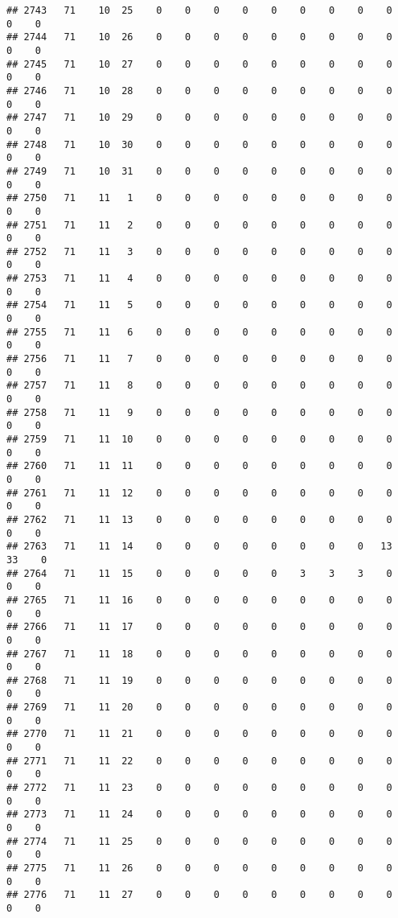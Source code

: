 \documentclass[]{article}
\begin{document}
\begin{verbatim}
## 2743   71    10  25    0    0    0    0    0    0    0    0    0    0    0
## 2744   71    10  26    0    0    0    0    0    0    0    0    0    0    0
## 2745   71    10  27    0    0    0    0    0    0    0    0    0    0    0
## 2746   71    10  28    0    0    0    0    0    0    0    0    0    0    0
## 2747   71    10  29    0    0    0    0    0    0    0    0    0    0    0
## 2748   71    10  30    0    0    0    0    0    0    0    0    0    0    0
## 2749   71    10  31    0    0    0    0    0    0    0    0    0    0    0
## 2750   71    11   1    0    0    0    0    0    0    0    0    0    0    0
## 2751   71    11   2    0    0    0    0    0    0    0    0    0    0    0
## 2752   71    11   3    0    0    0    0    0    0    0    0    0    0    0
## 2753   71    11   4    0    0    0    0    0    0    0    0    0    0    0
## 2754   71    11   5    0    0    0    0    0    0    0    0    0    0    0
## 2755   71    11   6    0    0    0    0    0    0    0    0    0    0    0
## 2756   71    11   7    0    0    0    0    0    0    0    0    0    0    0
## 2757   71    11   8    0    0    0    0    0    0    0    0    0    0    0
## 2758   71    11   9    0    0    0    0    0    0    0    0    0    0    0
## 2759   71    11  10    0    0    0    0    0    0    0    0    0    0    0
## 2760   71    11  11    0    0    0    0    0    0    0    0    0    0    0
## 2761   71    11  12    0    0    0    0    0    0    0    0    0    0    0
## 2762   71    11  13    0    0    0    0    0    0    0    0    0    0    0
## 2763   71    11  14    0    0    0    0    0    0    0    0   13   33    0
## 2764   71    11  15    0    0    0    0    0    3    3    3    0    0    0
## 2765   71    11  16    0    0    0    0    0    0    0    0    0    0    0
## 2766   71    11  17    0    0    0    0    0    0    0    0    0    0    0
## 2767   71    11  18    0    0    0    0    0    0    0    0    0    0    0
## 2768   71    11  19    0    0    0    0    0    0    0    0    0    0    0
## 2769   71    11  20    0    0    0    0    0    0    0    0    0    0    0
## 2770   71    11  21    0    0    0    0    0    0    0    0    0    0    0
## 2771   71    11  22    0    0    0    0    0    0    0    0    0    0    0
## 2772   71    11  23    0    0    0    0    0    0    0    0    0    0    0
## 2773   71    11  24    0    0    0    0    0    0    0    0    0    0    0
## 2774   71    11  25    0    0    0    0    0    0    0    0    0    0    0
## 2775   71    11  26    0    0    0    0    0    0    0    0    0    0    0
## 2776   71    11  27    0    0    0    0    0    0    0    0    0    0    0

\end{verbatim}
\end{document}
